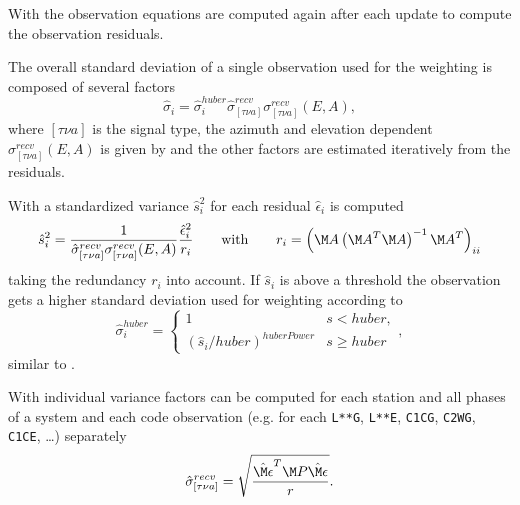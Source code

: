 With  the observation equations are computed
again after each update to compute the observation residuals.

The overall standard deviation of a single observation used for the weighting
is composed of several factors
\begin{equation}
  \hat{\sigma}_i = \hat{\sigma}_i^{huber} \hat{\sigma}_{[\tau\nu a]}^{recv} \sigma_{[\tau\nu a]}^{recv}(E,A),
\end{equation}
where $[\tau\nu a]$ is the signal type, the azimuth and elevation dependent $\sigma_{[\tau\nu a]}^{recv}(E,A)$ is given by
 and the other factors are
estimated iteratively from the residuals.

With  a standardized variance $\hat{s}_i^2$
for each residual $\hat{\epsilon}_i$ is computed
\begin{equation}
  \hat{s}_i^2 = \frac{1}{\hat{\sigma}_{[\tau\nu a]}^{recv} \sigma_{[\tau\nu a]}^{recv}(E,A)}\frac{\hat{\epsilon}_i^2}{r_i}
  \qquad\text{with}\qquad
  r_i = \left(\M A\left(\M A^T\M A\right)^{-1}\M A^T\right)_{ii}
\end{equation}
taking the redundancy $r_i$ into account. If $\hat{s}_i$ is above a threshold 
the observation gets a higher standard deviation used for weighting according to
\begin{equation}
  \hat{\sigma}_i^{huber} =
  \left\{ \begin{array}{ll}
    1                              & s < huber,\\
    (\hat{s}_i/huber)^{huberPower} & s \ge huber
  \end{array} \right.,
\end{equation}
similar to .

With  individual variance factors can be computed
for each station and all phases of a system and each code observation 
(e.g. for each \verb|L**G|, \verb|L**E|, \verb|C1CG|, \verb|C2WG|, \verb|C1CE|, \ldots)
separately
\begin{equation}
  \hat{\sigma}_{[\tau\nu a]}^{recv} = \sqrt{\frac{\hat{\M\epsilon}^T\M P\hat{\M\epsilon}}{r}}.
\end{equation}


